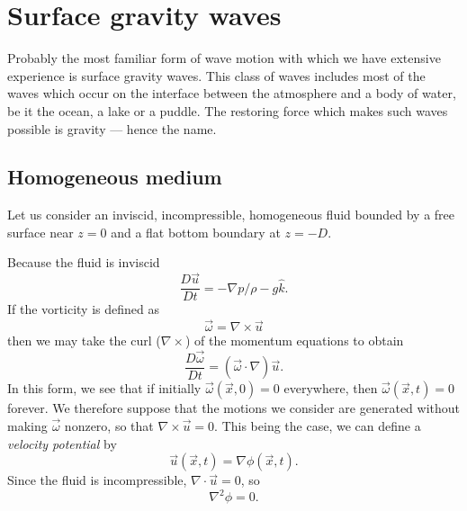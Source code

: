 
\setcounter{chapter}{2}

\chapter{Surface gravity waves}

Probably the most familiar form of wave motion with which we have extensive
experience is surface gravity waves. This class of waves includes most of the waves
which occur on the interface between the atmosphere and a body of water, be it the
ocean, a lake or a puddle. The restoring force which makes such waves possible is
gravity --- hence the name.

\section{Homogeneous medium}

Let us consider an inviscid, incompressible, homogeneous fluid bounded by a free
surface near $z=0$ and a flat bottom boundary at $z=-D$.

\sourcepagebreak


Because the fluid is inviscid
\[
	\frac{D\vec u}{Dt}=-\nabla p/\rho-g\hat k.
\]
If the vorticity is defined as
\[
	\vec\omega=\nabla\times\vec u
\]
then we may take the curl ($\nabla\times$) of the momentum equations to obtain
\[
	\frac{D\vec\omega}{Dt}=(\vec\omega\cdot\nabla)\vec u.
\]
In this form, we see that if initially $\vec\omega(\vec x,0)=0$ everywhere, then
$\vec\omega(\vec x,t)=0$ forever. We therefore suppose that the motions we consider are
generated without making $\vec\omega$ nonzero, so that $\nabla\times\vec u=0$. This being
the case, we can define a \emph{velocity potential} by
\[
	\vec u(\vec x,t)=\nabla\phi(\vec x,t).
\]
Since the fluid is incompressible, $\nabla\cdot\vec u=0$, so
\[
	\nabla^2\phi=0.
\]

